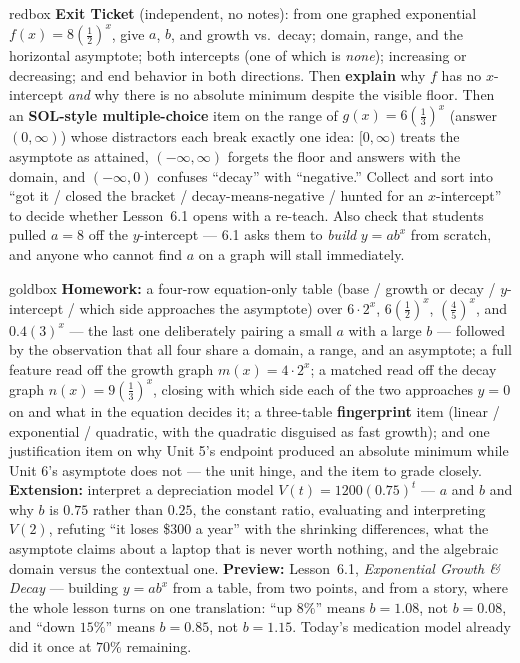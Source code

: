\documentclass[10pt]{article}
\begin{document}
\begin{skillbox}{redbox}
\textbf{Exit Ticket} (independent, no notes): from one graphed exponential
$f(x)=8\left(\frac12\right)^{x}$, give $a$, $b$, and growth vs.\ decay; domain, range, and the
horizontal asymptote; both intercepts (one of which is \emph{none}); increasing or decreasing; and
end behavior in both directions. Then \textbf{explain} why $f$ has no $x$-intercept \emph{and} why
there is no absolute minimum despite the visible floor. Then an \textbf{SOL-style multiple-choice}
item on the range of $g(x)=6\left(\frac13\right)^{x}$ (answer $(0,\infty)$) whose distractors each
break exactly one idea: $[0,\infty)$ treats the asymptote as attained, $(-\infty,\infty)$ forgets
the floor and answers with the domain, and $(-\infty,0)$ confuses ``decay'' with ``negative.''
Collect and sort into ``got it / closed the bracket / decay-means-negative / hunted for an
$x$-intercept'' to decide whether Lesson~6.1 opens with a re-teach. Also check that students pulled
$a=8$ off the $y$-intercept --- 6.1 asks them to \emph{build} $y=ab^{x}$ from scratch, and anyone who
cannot find $a$ on a graph will stall immediately.
\end{skillbox}

\begin{skillbox}{goldbox}
\textbf{Homework:} a four-row equation-only table (base / growth or decay / $y$-intercept / which
side approaches the asymptote) over $6\cdot2^{x}$, $6\left(\frac12\right)^{x}$,
$\left(\frac45\right)^{x}$, and $0.4(3)^{x}$ --- the last one deliberately pairing a small $a$ with a
large $b$ --- followed by the observation that all four share a domain, a range, and an asymptote; a
full feature read off the growth graph $m(x)=4\cdot2^{x}$; a matched read off the decay graph
$n(x)=9\left(\frac13\right)^{x}$, closing with which side each of the two approaches $y=0$ on and
what in the equation decides it; a three-table \textbf{fingerprint} item (linear / exponential /
quadratic, with the quadratic disguised as fast growth); and one justification item on why Unit 5's
endpoint produced an absolute minimum while Unit 6's asymptote does not --- the unit hinge, and the
item to grade closely. \textbf{Extension:} interpret a depreciation model $V(t)=1200(0.75)^{t}$ ---
$a$ and $b$ and why $b$ is $0.75$ rather than $0.25$, the constant ratio, evaluating and
interpreting $V(2)$, refuting ``it loses \$300 a year'' with the shrinking differences, what the
asymptote claims about a laptop that is never worth nothing, and the algebraic domain versus the
contextual one. \textbf{Preview:} Lesson~6.1, \emph{Exponential Growth \& Decay} --- building
$y=ab^{x}$ from a table, from two points, and from a story, where the whole lesson turns on one
translation: ``up $8\%$'' means $b=1.08$, not $b=0.08$, and ``down $15\%$'' means $b=0.85$, not
$b=1.15$. Today's medication model already did it once at $70\%$ remaining.
\end{skillbox}
\end{document}
